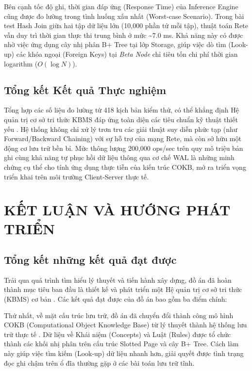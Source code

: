 \documentclass[13pt,a4paper,oneside]{extreport}
\begin{document}
Bên cạnh tốc độ ghi, thời gian đáp ứng (Response Time) của Inference Engine cũng được đo lường trong tình huống xấu nhất (Worst-case Scenario). Trong bài test Hash Join giữa hai tập dữ liệu lớn (10,000 phần tử mỗi tập), thuật toán Rete vẫn duy trì thời gian thực thi trung bình ở mức \textasciitilde{}7.0 ms. Khả năng này có được nhờ việc ứng dụng cây nhị phân B+ Tree tại lớp Storage, giúp việc dò tìm (Look-up) các khóa ngoại (Foreign Keys) tại \textit{Beta Node} chỉ tiêu tốn chi phí thời gian logarithm ($O(\log N)$).


\section{Tổng kết Kết quả Thực nghiệm}


Tổng hợp các số liệu đo lường từ 418 kịch bản kiểm thử, có thể khẳng định Hệ quản trị cơ sở tri thức KBMS đáp ứng toàn diện các tiêu chuẩn kỹ thuật thiết yếu \cite{Musen_Protege}. Hệ thống không chỉ xử lý trơn tru các giải thuật suy diễn phức tạp (như Forward/Backward Chaining) với sự hỗ trợ của mạng Rete, mà còn sở hữu một động cơ lưu trữ bền bỉ. Mức thông lượng 200,000 ops/sec trên quy mô triệu bản ghi cùng khả năng tự phục hồi dữ liệu thông qua cơ chế WAL là những minh chứng cụ thể cho tính ứng dụng thực tiễn của kiến trúc COKB, mở ra triển vọng triển khai trên môi trường Client-Server thực tế.


\clearpage

\chapter{KẾT LUẬN VÀ HƯỚNG PHÁT TRIỂN}

\section{Tổng kết những kết quả đạt được}


Trải qua quá trình tìm hiểu lý thuyết và tiến hành xây dựng, đồ án đã hoàn thành mục tiêu ban đầu là thiết kế và phát triển một Hệ quản trị cơ sở tri thức (KBMS) cơ bản \cite{ReteAlgorithm}. Các kết quả đạt được của đồ án bao gồm ba điểm chính:


Thứ nhất, về mặt cấu trúc lưu trữ, đồ án đã chuyển đổi thành công mô hình COKB (Computational Object Knowledge Base) từ lý thuyết thành hệ thống lưu trữ thực tế \cite{ComerBTree}. Dữ liệu về Khái niệm (Concepts) và Luật (Rules) được tổ chức thành các khối nhị phân trên cấu trúc Slotted Page và cây B+ Tree. Cách làm này giúp việc tìm kiếm (Look-up) dữ liệu nhanh hơn, giải quyết được tình trạng đọc ghi chậm trên ổ đĩa thường gặp ở các bài toán lưu trữ tĩnh.
\end{document}
